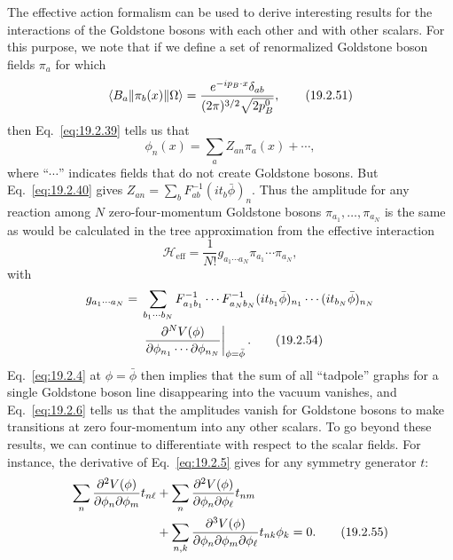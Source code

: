 The effective action formalism can be used to derive interesting results for
the interactions of the Goldstone bosons with each other and with other
scalars. For this purpose, we note that if we define a set of renormalized
Goldstone boson fields $\pi_a$ for which
\begin{equation}
 \langle B_a\rVert\pi_b(x)\lVert \Omega\rangle
 =\frac{e^{-ip_B\cdot x}\delta_{ab}}
 {(2\pi)^{3/2}\sqrt{2p_B^0}},
 \tag{19.2.51}\label{eq:19.2.51}
\end{equation}
then Eq.~\eqref{eq:19.2.39} tells us that
\begin{equation}
 \phi_n(x)=\sum_a Z_{an}\pi_a(x)+\cdots,
 \tag{19.2.52}\label{eq:19.2.52}
\end{equation}
where ``$\cdots$'' indicates fields that do not create Goldstone bosons. But
Eq.~\eqref{eq:19.2.40} gives
$Z_{an}=\sum_bF^{-1}_{ab}(it_b\bar\phi)_n$. Thus the amplitude for any
reaction among $N$ zero-four-momentum Goldstone bosons
$\pi_{a_1},\ldots,\pi_{a_N}$ is the same as would be calculated in the tree
approximation from the effective interaction
\begin{equation}
 \mathcal H_{\mathrm{eff}}
 =\frac{1}{N!}g_{a_1\cdots a_N}\pi_{a_1}\cdots\pi_{a_N},
 \tag{19.2.53}\label{eq:19.2.53}
\end{equation}
with
\begin{align}
 g_{a_1\cdots a_N}
={}&\sum_{b_1\cdots b_N}
 F^{-1}_{a_1b_1}\cdots F^{-1}_{a_Nb_N}
 (it_{b_1}\bar\phi)_{n_1}\cdots(it_{b_N}\bar\phi)_{n_N}
 \notag\\
 &{}\left.
 \frac{\partial^N V(\phi)}
 {\partial\phi_{n_1}\cdots\partial\phi_{n_N}}
 \right|_{\phi=\bar\phi}.
 \tag{19.2.54}\label{eq:19.2.54}
\end{align}
Eq.~\eqref{eq:19.2.4} at $\phi=\bar\phi$ then implies that the sum of all
``tadpole'' graphs for a single Goldstone boson line disappearing into the
vacuum vanishes, and Eq.~\eqref{eq:19.2.6} tells us that the amplitudes vanish
for Goldstone bosons to make transitions at zero four-momentum into any
other scalars. To go beyond these results, we can continue to differentiate
with respect to the scalar fields. For instance, the derivative of
Eq.~\eqref{eq:19.2.5} gives for any symmetry generator $t$:
\begin{align}
 \sum_n\frac{\partial^2V(\phi)}{\partial\phi_n\partial\phi_m}t_{n\ell}
 &+\sum_n\frac{\partial^2V(\phi)}{\partial\phi_n\partial\phi_\ell}t_{nm}
 \notag\\
 &+\sum_{n,k}
 \frac{\partial^3V(\phi)}
 {\partial\phi_n\partial\phi_m\partial\phi_\ell}
 t_{nk}\phi_k=0.
 \tag{19.2.55}\label{eq:19.2.55}
\end{align}
